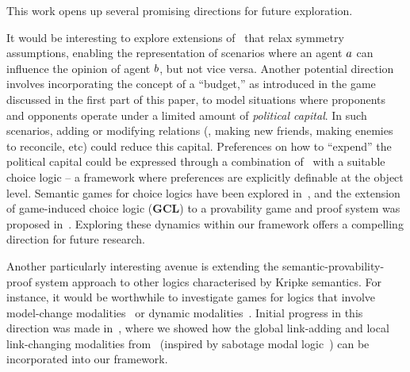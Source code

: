 
This work opens up several promising directions for future exploration.

It would be interesting to explore extensions of \PNL\ that relax symmetry assumptions, enabling the representation of scenarios where an agent $\ag$ can influence the opinion of agent $\b$, but not vice versa. Another potential direction involves incorporating the concept of a ``budget,'' as introduced in the game discussed in the first part of this paper, to model situations where proponents and opponents operate under a limited amount of \emph{political capital}. In such scenarios, adding or modifying relations (\ie, making new friends, making enemies to reconcile, etc) could reduce this capital.
Preferences on how to ``expend'' the political capital could be expressed through a combination of \PNL\ with a suitable choice logic -- a framework where preferences are explicitly definable at the object level. Semantic games for choice logics have been explored in~\cite{Freiman2023TruthLogic}, and the extension of game-induced choice logic (\textbf{GCL}) to a provability game and proof system was proposed in~\cite{Freiman2023}. 
Exploring these dynamics within our framework
offers a compelling direction for future research.


Another particularly interesting avenue is extending the semantic-provability-proof system approach to other logics characterised by Kripke semantics. For instance, it would be worthwhile to investigate games for logics that involve model-change modalities~\cite{DBLP:journals/logcom/Velazquez-Quesada17,DBLP:journals/igpl/PerrotinV21} or dynamic modalities~\cite{DBLP:journals/synthese/BenthemGL08}. Initial progress in this direction was made in~\cite{LPAR2024:Reasoning_About_Group_Polarization}, where we showed how the global link-adding and local link-changing modalities from~\cite{DBLP:journals/logcom/PedersenSA21} (inspired by sabotage modal logic~\cite{DBLP:journals/igpl/ArecesFH15,DBLP:journals/logcom/AucherBG18,DBLP:journals/logcom/BenthemLSY23}) can be incorporated into our framework.


